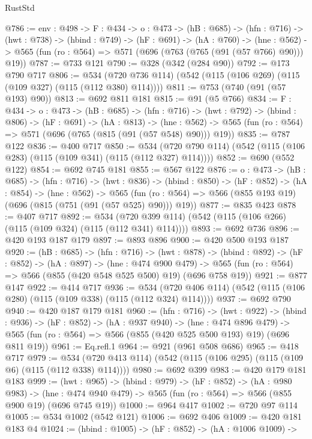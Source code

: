 \begin{lexlean}{RustStd}
\begin{coremodule}
{\begin{coremodule}
@786 := {env : @498} ->
  {F : @434} ->
  {o : @473} ->
  (hB : @685) ->
  (hfn : @716) ->
  (hwt : @738) ->
  (hbind : @749) ->
  (hF : @691) ->
  (hA : @760) ->
  (hne : @562) -> @565 (fun (ro : @564) => @571 (@696 (@763 (@765 (@91 (@57 @766) @90))) @19))
@787 := @733 @121
@790 := @328 (@342 (@284 @90))
@792 := @173 @790 @717
@806 := @534 (@720 @736 @114) (@542 (@115 (@106 @269) (@115 (@109 @327) (@115 (@112 @380) @114))))
@811 := @753 (@740 (@91 (@57 @193) @90))
@813 := @692 @811 @181
@815 := @91 (@5 @766)
@834 := {F : @434} ->
  {o : @473} ->
  (hB : @685) ->
  (hfn : @716) ->
  (hwt : @792) ->
  (hbind : @806) ->
  (hF : @691) ->
  (hA : @813) ->
  (hne : @562) -> @565 (fun (ro : @564) => @571 (@696 (@765 (@815 (@91 (@57 @548) @90))) @19))
@835 := @787 @122
@836 := @400 @717
@850 := @534 (@720 @790 @114) (@542 (@115 (@106 @283) (@115 (@109 @341) (@115 (@112 @327) @114))))
@852 := @690 (@552 @122)
@854 := @692 @745 @181
@855 := @567 @122
@876 := {o : @473} ->
  (hB : @685) ->
  (hfn : @716) ->
  (hwt : @836) ->
  (hbind : @850) ->
  (hF : @852) ->
  (hA : @854) ->
  (hne : @562) ->
  @565 (fun (ro : @564) => @566 (@855 @193 @19) (@696 (@815 (@751 (@91 (@57 @525) @90))) @19))
@877 := @835 @423
@878 := @407 @717
@892 := @534 (@720 @399 @114) (@542 (@115 (@106 @266) (@115 (@109 @324) (@115 (@112 @341) @114))))
@893 := @692 @736
@896 := @420 @193 @187 @179
@897 := @893 @896
@900 := @420 @500 @193 @187
@920 := (hB : @685) ->
  (hfn : @716) ->
  (hwt : @878) ->
  (hbind : @892) ->
  (hF : @852) ->
  (hA : @897) ->
  (hne : @474 @900 @479) ->
  @565 (fun (ro : @564) => @566 (@855 (@420 @548 @525 @500) @19) (@696 @758 @19))
@921 := @877 @147
@922 := @414 @717
@936 := @534 (@720 @406 @114) (@542 (@115 (@106 @280) (@115 (@109 @338) (@115 (@112 @324) @114))))
@937 := @692 @790
@940 := @420 @187 @179 @181
@960 := (hfn : @716) ->
  (hwt : @922) ->
  (hbind : @936) ->
  (hF : @852) ->
  (hA : @937 @940) ->
  (hne : @474 @896 @479) ->
  @565 (fun (ro : @564) => @566 (@855 (@420 @525 @500 @193) @19) (@696 @811 @19))
@961 := Eq.refl.{1}
@964 := @921 (@961 @508 @686)
@965 := @418 @717
@979 := @534 (@720 @413 @114) (@542 (@115 (@106 @295) (@115 (@109 @6) (@115 (@112 @338) @114))))
@980 := @692 @399
@983 := @420 @179 @181 @183
@999 := (hwt : @965) ->
  (hbind : @979) ->
  (hF : @852) ->
  (hA : @980 @983) ->
  (hne : @474 @940 @479) -> @565 (fun (ro : @564) => @566 (@855 @900 @19) (@696 @745 @19))
@1000 := @964 @417
@1002 := @720 @97 @114
@1005 := @534 @1002 (@542 @121)
@1006 := @692 @406
@1009 := @420 @181 @183 @4
@1024 := (hbind : @1005) ->
  (hF : @852) ->
  (hA : @1006 @1009) ->

\end{coremodule}}
\end{coremodule}
\end{lexlean}
